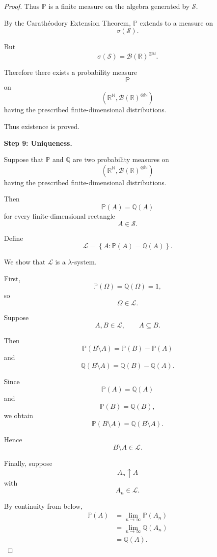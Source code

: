 \begin{proof}
Thus $\mathbb{P}$ is a finite measure on the algebra generated by
$\mathcal{S}$.

By the Carath\'eodory Extension Theorem, $\mathbb{P}$ extends to a
measure on
\[
\sigma(\mathcal{S}).
\]

But
\[
\sigma(\mathcal{S})
=
\mathcal{B}(\mathbb{R})^{\otimes\mathbb{N}}.
\]

Therefore there exists a probability measure
\[
\mathbb{P}
\]
on
\[
\left(
\mathbb{R}^{\mathbb{N}},
\mathcal{B}(\mathbb{R})^{\otimes\mathbb{N}}
\right)
\]
having the prescribed finite-dimensional distributions.

Thus existence is proved.

\medskip
\noindent
\textbf{Step 9: Uniqueness.}

Suppose that $\mathbb{P}$ and $\mathbb{Q}$ are two probability
measures on
\[
\left(
\mathbb{R}^{\mathbb{N}},
\mathcal{B}(\mathbb{R})^{\otimes\mathbb{N}}
\right)
\]
having the prescribed finite-dimensional distributions.

Then
\[
\mathbb{P}(A)=\mathbb{Q}(A)
\]
for every finite-dimensional rectangle
\[
A\in\mathcal{S}.
\]

Define
\[
\mathcal{L}
=
\left\{
A:
\mathbb{P}(A)=\mathbb{Q}(A)
\right\}.
\]

We show that $\mathcal{L}$ is a $\lambda$-system.

First,
\[
\mathbb{P}(\Omega)
=
\mathbb{Q}(\Omega)
=
1,
\]
so
\[
\Omega\in\mathcal{L}.
\]

Suppose
\[
A,B\in\mathcal{L},
\qquad
A\subseteq B.
\]

Then
\[
\mathbb{P}(B\setminus A)
=
\mathbb{P}(B)-\mathbb{P}(A)
\]
and
\[
\mathbb{Q}(B\setminus A)
=
\mathbb{Q}(B)-\mathbb{Q}(A).
\]

Since
\[
\mathbb{P}(A)=\mathbb{Q}(A)
\]
and
\[
\mathbb{P}(B)=\mathbb{Q}(B),
\]
we obtain
\[
\mathbb{P}(B\setminus A)
=
\mathbb{Q}(B\setminus A).
\]

Hence
\[
B\setminus A\in\mathcal{L}.
\]

Finally, suppose
\[
A_n\uparrow A
\]
with
\[
A_n\in\mathcal{L}.
\]

By continuity from below,
\[
\begin{aligned}
\mathbb{P}(A)
&=
\lim_{n\to\infty}\mathbb{P}(A_n)\\
&=
\lim_{n\to\infty}\mathbb{Q}(A_n)\\
&=
\mathbb{Q}(A).
\end{aligned}
\]


\end{proof}
